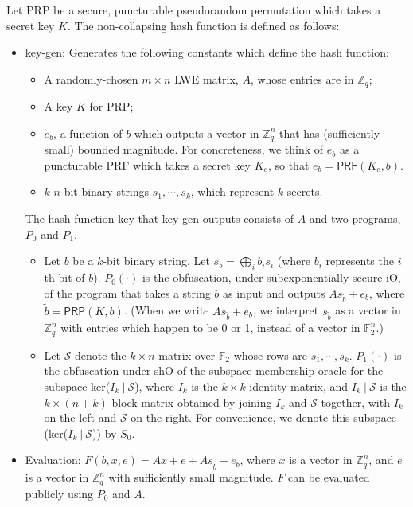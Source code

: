 \documentclass{article}
\begin{document}
Let \textsf{PRP} be a secure, puncturable pseudorandom permutation which takes a secret key $K$. The non-collapsing hash function is defined as follows:
\begin{itemize}
    \item \textsf{key-gen}: Generates the following constants which define the hash function:
    \begin{itemize}
        \item A randomly-chosen $m \times n$ LWE matrix, $A$, whose entries are in $\mathbb{Z}_q$;
        \item A key $K$ for \textsf{PRP};
        \item $e_b$, a function of $b$ which outputs a vector in $\mathbb{Z}_q^n$ that has (sufficiently small) bounded magnitude. For concreteness, we think of $e_b$ as a puncturable PRF which takes a secret key $K_e$, so that $e_b = \textsf{PRF}(K_e, b)$.
        \item $k$ $n$-bit binary strings $s_1, \cdots, s_k$, which represent $k$ secrets.
    \end{itemize}
    The hash function key that \textsf{key-gen} outputs consists of $A$ and two programs, $P_0$ and $P_1$.
    \begin{itemize}
        \item Let $b$ be a $k$-bit binary string. Let $s_b = \bigoplus_i b_i s_i$ (where $b_i$ represents the $i$th bit of $b$). $P_0(\cdot)$ is the obfuscation, under subexponentially secure \textsf{iO}, of the program that takes a string $b$ as input and outputs $As_{\widetilde{b}} + e_{b}$, where $\widetilde{b} = \textsf{PRP}(K, b)$. (When we write $As_{\widetilde{b}} + e_{b}$, we interpret $s_{\widetilde{b}}$ as a vector in $\mathbb{Z}_q^n$ with entries which happen to be 0 or 1, instead of a vector in $\mathbb{F}_2^n$.)
        \item Let $\mathcal{S}$ denote the $k \times n$ matrix over $\mathbb{F}_2$ whose rows are $s_1, \cdots, s_k$. $P_1(\cdot)$ is the obfuscation under \textsf{shO} of the subspace membership oracle for the subspace ker($I_k \: | \: \mathcal{S}$), where $I_k$ is the $k \times k$ identity matrix, and $I_k \: | \: \mathcal{S}$ is the $k \times (n+k)$ block matrix obtained by joining $I_k$ and $\mathcal{S}$ together, with $I_k$ on the left and $\mathcal{S}$ on the right. For convenience, we denote this subspace (ker($I_k \: | \: \mathcal{S}$)) by $S_0$.
    \end{itemize}
    \item Evaluation: $F(b, x, e) = Ax + e + As_{\widetilde{b}} + e_{b}$, where $x$ is a vector in $\mathbb{Z}_q^n$, and $e$ is a vector in $\mathbb{Z}_q^n$ with sufficiently small magnitude. $F$ can be evaluated publicly using $P_0$ and $A$.
\end{itemize}
\end{document}
